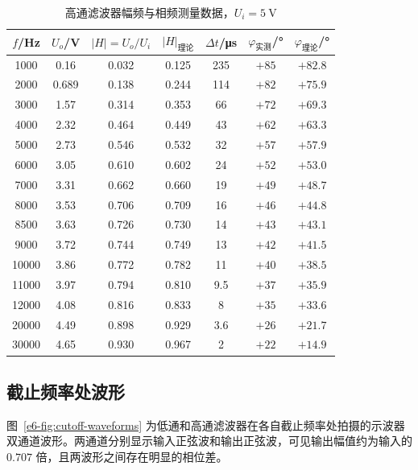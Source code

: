 \begin{table}[H]
    \centering
    \caption{高通滤波器幅频与相频测量数据，\(U_i=\SI{5}{\volt}\)}
    \label{e6-tab:hp-data}
    \small
    \begin{tabular}{ccccccc}
        \toprule
        \(f\)/Hz & \(U_o\)/V & \(|H|=U_o/U_i\) & \(|H|_{\text{理论}}\) & \(\Delta t\)/\si{\micro\second} & \(\varphi_{\text{实测}}\)/° & \(\varphi_{\text{理论}}\)/° \\
        \midrule
        1000   & 0.16  & 0.032 & 0.125 & 235   & \(+85\)   & \(+82.8\) \\
        2000   & 0.689 & 0.138 & 0.244 & 114   & \(+82\)   & \(+75.9\) \\
        3000   & 1.57  & 0.314 & 0.353 & 66    & \(+72\)   & \(+69.3\) \\
        4000   & 2.32  & 0.464 & 0.449 & 43    & \(+62\)   & \(+63.3\) \\
        5000   & 2.73  & 0.546 & 0.532 & 32    & \(+57\)   & \(+57.9\) \\
        6000   & 3.05  & 0.610 & 0.602 & 24    & \(+52\)   & \(+53.0\) \\
        7000   & 3.31  & 0.662 & 0.660 & 19    & \(+49\)   & \(+48.7\) \\
        8000   & 3.53  & 0.706 & 0.709 & 16    & \(+46\)   & \(+44.8\) \\
        8500   & 3.63  & 0.726 & 0.730 & 14    & \(+43\)   & \(+43.1\) \\
        9000   & 3.72  & 0.744 & 0.749 & 13    & \(+42\)   & \(+41.5\) \\
        10000  & 3.86  & 0.772 & 0.782 & 11    & \(+40\)   & \(+38.5\) \\
        11000  & 3.97  & 0.794 & 0.810 & 9.5   & \(+37\)   & \(+35.9\) \\
        12000  & 4.08  & 0.816 & 0.833 & 8     & \(+35\)   & \(+33.6\) \\
        20000  & 4.49  & 0.898 & 0.929 & 3.6   & \(+26\)   & \(+21.7\) \\
        30000  & 4.65  & 0.930 & 0.967 & 2     & \(+22\)   & \(+14.9\) \\
        \bottomrule
    \end{tabular}
\end{table}

\subsection{截止频率处波形}

图~\ref{e6-fig:cutoff-waveforms} 为低通和高通滤波器在各自截止频率处拍摄的示波器双通道波形。两通道分别显示输入正弦波和输出正弦波，可见输出幅值约为输入的 \(0.707\) 倍，且两波形之间存在明显的相位差。

